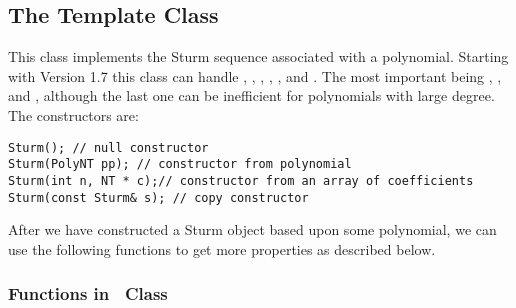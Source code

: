 \subsection{The Template Class \Sturm}

This class implements the Sturm sequence associated with a polynomial. 
Starting with Version 1.7 this class can handle \int, \Int, \lng,
\Rat, \BF, and \expr. The most important being \Int, \BF, and \expr,
although the last one can be inefficient for polynomials with large degree.
The constructors are:

\begin{progb}{
\> \tt  Sturm(); // null constructor\\
\> \tt  Sturm(PolyNT pp); // constructor from polynomial\\
\> \tt  Sturm(int n, NT * c);// constructor from an array of coefficients\\
\> \tt  Sturm(const Sturm\& s);  // copy constructor
}\end{progb}

After we have constructed a Sturm object based upon some polynomial, we can 
use the following functions to get more properties as described below.

\subsubsection{Functions in \Sturm\ Class}


